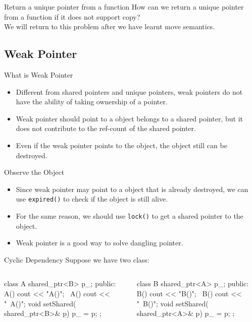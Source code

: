 \begin{frame}[fragile]{Return a unique pointer from a function}
How can we return a unique pointer from a function if it does not support copy?
\pause
\\We will return to this problem after we have learnt move semantics.
\end{frame}
\subsection{Weak Pointer}
\begin{frame}{What is Weak Pointer}
\begin{itemize}
  \item Different from shared pointers and unique pointers, weak pointers do not have the ability of taking ownership of a pointer.
  \item Weak pointer should point to a object belongs to a shared pointer, but it does not contribute to the ref-count of the shared pointer.
  \item Even if the weak pointer points to the object, the object still can be destroyed.
\end{itemize}
\end{frame}
\begin{frame}[fragile]{Observe the Object}
  \begin{itemize}
    \item Since weak pointer may point to a object that is already destroyed, we can use \texttt{expired()} to check if the object is still alive.
    \item For the same reason, we should use \texttt{lock()} to get a shared pointer to the object. 
    \item Weak pointer is a good way to solve dangling pointer.
  \end{itemize}
\end{frame}

\begin{frame}[fragile]{Cyclic Dependency}
  Suppose we have two class:
  \begin{columns}
    \begin{column}{0.5\linewidth}
      \begin{cpp}
class A {
  shared_ptr<B> p_; 
 public:
  A() {  cout << "A()\n"; }
  ~A() { cout << "~A()\n"; }
  void setShared(
    shared_ptr<B>& p) {
    p_ = p;
  }
};
      \end{cpp}
    \end{column}
    \begin{column}{0.5\linewidth}
      \begin{cpp}
class B {
  shared_ptr<A> p_;
 public:
  B() { cout << "B()\n"; }
  ~B() { cout << "~B()\n"; }
  void setShared(
    shared_ptr<A>& p) {
    p_ = p;
  }
};
      \end{cpp}
    \end{column}
  \end{columns}
\end{frame}


